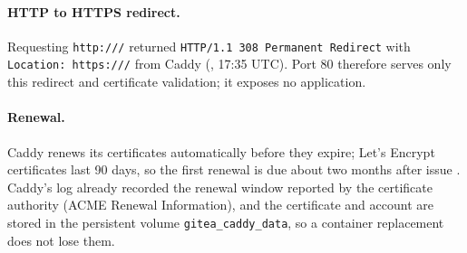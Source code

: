 \begin{longlisting}
\inputminted[fontsize=\scriptsize]{text}{evidence/13-https-redirect-cert-and-port-probes-2026-10-15.txt}
\caption{HTTP redirect, HTTPS response, the served certificate, and port probes from the administrator's computer, October 15, 2026, 17:35 UTC (real output).}
\label{Listing:E13}
\end{longlisting}

\paragraph{HTTP to HTTPS redirect.}
Requesting \texttt{http://\GiteaHost/} returned \texttt{HTTP/1.1 308 Permanent
Redirect} with \texttt{Location: https://\GiteaHost/} from Caddy (,
17:35 UTC). Port 80 therefore serves only this redirect and certificate
validation; it exposes no application.

\paragraph{Renewal.}
Caddy renews its certificates automatically before they expire; Let's Encrypt
certificates last 90 days, so the first renewal is due about two months after
issue \cite{CaddyAutoHTTPS}. Caddy's log already recorded the renewal window
reported by the certificate authority (ACME Renewal Information), and the
certificate and account are stored in the persistent volume
\texttt{gitea\_caddy\_data}, so a container replacement does not lose them.
